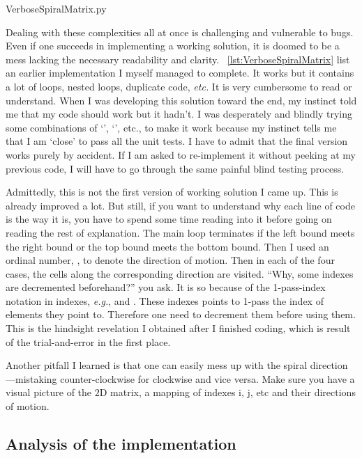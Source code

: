 \begin{clisting}
    
    {VerboseSpiralMatrix.py}
\end{clisting}\newpage

Dealing with these complexities all at once is challenging and vulnerable to bugs.
Even if one succeeds in implementing a working solution, it is doomed to be a mess lacking the
necessary readability and clarity.
~\autoref{lst:VerboseSpiralMatrix} list an earlier implementation I myself managed to complete.
It works but it contains a lot of loops, nested loops, duplicate code, \textit{etc.}
It is very cumbersome to read or understand.
When I was developing this solution toward the end, my instinct told me that my code should work
but it hadn't.
I was desperately and blindly trying some combinations of `', `', etc., to
make it work
because my instinct tells me that I am `close' to pass all the unit tests.
I have to admit that the final version works purely by accident.
If I am asked to re-implement it without peeking at my previous code, I will have to go
through the same painful blind testing process.


Admittedly, this is not the first version of working solution I came up.
This is already improved a lot.
But still, if you want to understand why each line of code is the way it is, you have to spend some
time reading into it before going on reading the rest of explanation.
The main loop terminates if the left bound meets the right bound or the top bound meets the
bottom bound.
Then I used an ordinal number, , to denote the direction of motion.
Then in each of the four cases, the cells along the corresponding direction are visited.
``Why, some indexes are decremented beforehand?'' you ask.
It is so because of the 1-pass-index notation in indexes, \textit{e.g.},  and .
These indexes points to 1-pass the index of elements they point to.
Therefore one need to decrement them before using them.
This is the hindsight revelation I obtained after I finished coding, which is result of the
trial-and-error in the first place.

Another pitfall I learned is that one can easily mess up with the spiral
direction---mistaking counter-clockwise for clockwise and vice versa.
Make sure you have a visual picture of the $2$D matrix, a mapping of indexes i, j, etc and their
directions of motion.

\subsection{Analysis of the implementation}\label{subsec:implement.analysis.spiral-matrix}

